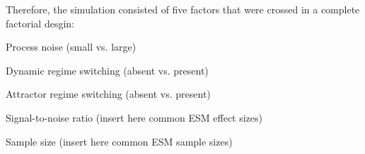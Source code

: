 Therefore, the simulation consisted of five factors that were crossed in a complete 
factorial desgin: 

\begin{APAenumerate}
    \item Process noise (small vs. large)
    \item Dynamic regime switching (absent vs. present)
    \item Attractor regime switching (absent vs. present)
    \item Signal-to-noise ratio (insert here common ESM effect sizes)
    \item Sample size (insert here common ESM sample sizes)
\end{APAenumerate}
